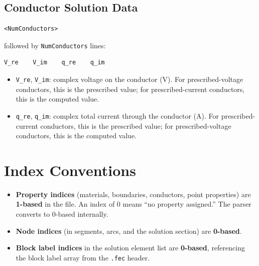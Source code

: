\documentclass[11pt]{article}
\begin{document}
\subsection{Conductor Solution Data}

\begin{lstlisting}
<NumConductors>
\end{lstlisting}

followed by \texttt{NumConductors} lines:

\begin{lstlisting}
V_re    V_im    q_re    q_im
\end{lstlisting}

\begin{itemize}[nosep]
  \item \texttt{V\_re}, \texttt{V\_im}: complex voltage on the
        conductor (V).  For prescribed-voltage conductors, this is
        the prescribed value; for prescribed-current conductors, this
        is the computed value.
  \item \texttt{q\_re}, \texttt{q\_im}: complex total current through
        the conductor (A).  For prescribed-current conductors, this is
        the prescribed value; for prescribed-voltage conductors, this
        is the computed value.
\end{itemize}

\section{Index Conventions}

\begin{itemize}
  \item \textbf{Property indices} (materials, boundaries, conductors,
        point properties) are \textbf{1-based} in the file.  An index
        of 0 means ``no property assigned.''  The parser converts to
        0-based internally.

  \item \textbf{Node indices} (in segments, arcs, and the solution
        section) are \textbf{0-based}.

  \item \textbf{Block label indices} in the solution element list are
        \textbf{0-based}, referencing the block label array from the
        \texttt{.fec} header.
\end{itemize}
\end{document}
